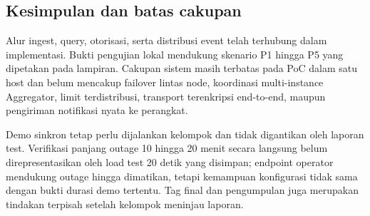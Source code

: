 
\subsection{Kesimpulan dan batas cakupan}
Alur ingest, query, otorisasi, serta distribusi event telah terhubung dalam implementasi. Bukti pengujian lokal mendukung skenario P1 hingga P5 yang dipetakan pada lampiran. Cakupan sistem masih terbatas pada PoC dalam satu host dan belum mencakup failover lintas node, koordinasi multi-instance Aggregator, limit terdistribusi, transport terenkripsi end-to-end, maupun pengiriman notifikasi nyata ke perangkat.

Demo sinkron tetap perlu dijalankan kelompok dan tidak digantikan oleh laporan test. Verifikasi panjang outage 10 hingga 20 menit secara langsung belum direpresentasikan oleh load test 20 detik yang disimpan; endpoint operator mendukung outage hingga dimatikan, tetapi kemampuan konfigurasi tidak sama dengan bukti durasi demo tertentu. Tag final dan pengumpulan juga merupakan tindakan terpisah setelah kelompok meninjau laporan.
